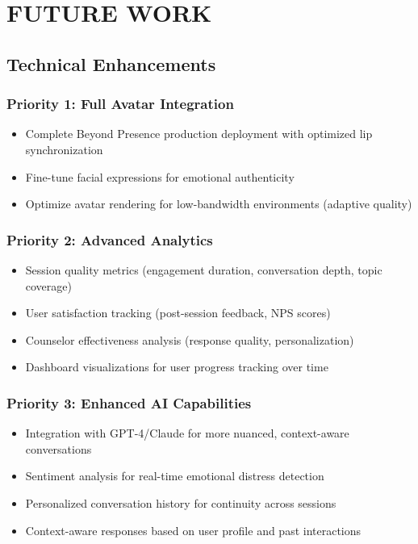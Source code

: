 \documentclass[11pt,a4paper]{report}
\begin{document}
\chapter{FUTURE WORK}

\section{Technical Enhancements}

\subsection{Priority 1: Full Avatar Integration}
\begin{itemize}
    \item Complete Beyond Presence production deployment with optimized lip synchronization
    \item Fine-tune facial expressions for emotional authenticity
    \item Optimize avatar rendering for low-bandwidth environments (adaptive quality)
\end{itemize}

\subsection{Priority 2: Advanced Analytics}
\begin{itemize}
    \item Session quality metrics (engagement duration, conversation depth, topic coverage)
    \item User satisfaction tracking (post-session feedback, NPS scores)
    \item Counselor effectiveness analysis (response quality, personalization)
    \item Dashboard visualizations for user progress tracking over time
\end{itemize}

\subsection{Priority 3: Enhanced AI Capabilities}
\begin{itemize}
    \item Integration with GPT-4/Claude for more nuanced, context-aware conversations
    \item Sentiment analysis for real-time emotional distress detection
    \item Personalized conversation history for continuity across sessions
    \item Context-aware responses based on user profile and past interactions
\end{itemize}
\end{document}
